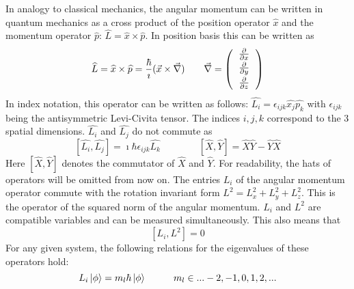 In analogy to classical mechanics, the angular momentum can be written in quantum mechanics as a cross product of the position operator \textit{$\widehat{x}$} and the momentum operator \textit{$\widehat{p}$}: $\widehat{L} = \widehat{x} \times \widehat{p}$. In position basis this can be written as
\begin{equation}
 \widehat{L} = \widehat{x} \times \widehat{p} = \frac{\hbar}{\imath}(\vec{x}\times \vec{\nabla}) \hspace{2em} \vec{\nabla}= \left (
  \begin{tabular}{c}
  $\frac{\partial}{\partial x}$\vspace{0.2em}\\
  $\frac{\partial}{\partial y}$\vspace{0.2em}\\
  $\frac{\partial}{\partial z}$\vspace{0.2em}
  \end{tabular}
\right )
\end{equation} 
In index notation, this operator can be written as follows: $\widehat{L_{i}}=\epsilon_{ijk} \widehat{x_{j}}\widehat{p_{k}}$ with $\epsilon_{ijk}$ being the antisymmetric Levi-Civita tensor. The indices $i,j,k$ correspond to the 3 spatial dimensions. $\widehat{L_{i}}$ and $\widehat{L_{j}}$ do not commute as 
\begin{equation}  
\label{eq:LCommutator1}
 [\widehat{L_{i}},\widehat{L_{j}}]=\imath\hbar\epsilon_{ijk}\widehat{L_{k}} \hspace{4em}  [\widehat{X},\widehat{Y}] = \widehat{X}\widehat{Y} - \widehat{Y}\widehat{X}                                                                                                                                                                                                \end{equation} 
Here $[\widehat{X},\widehat{Y}]$ denotes the commutator of $\widehat{X}$ and $\widehat{Y}$. For readability, the hats of operators will be omitted from now on. The entries $L_{i}$ of the angular momentum operator commute with the rotation invariant form $L^{2} = L_{x}^2+L_{y}^2+L_{z}^2$. This is the operator of the squared norm of the angular momentum. $L_{i}$ and $L^{2}$ are compatible variables and can be measured simultaneously. This also means that
\begin{equation}
\label{eq:LCommutator2}
 [L_{i},L^{2}]=0
\end{equation} 
For any given system, the following relations for the eigenvalues of these operators hold:
\begin{equation}
\label{eq:ml}
 L_{i}\ket{\phi}=m_{l}\hbar\ket{\phi} \hspace{1cm} m_{l}\in{...-2,-1,0,1,2,...}
\end{equation} 
